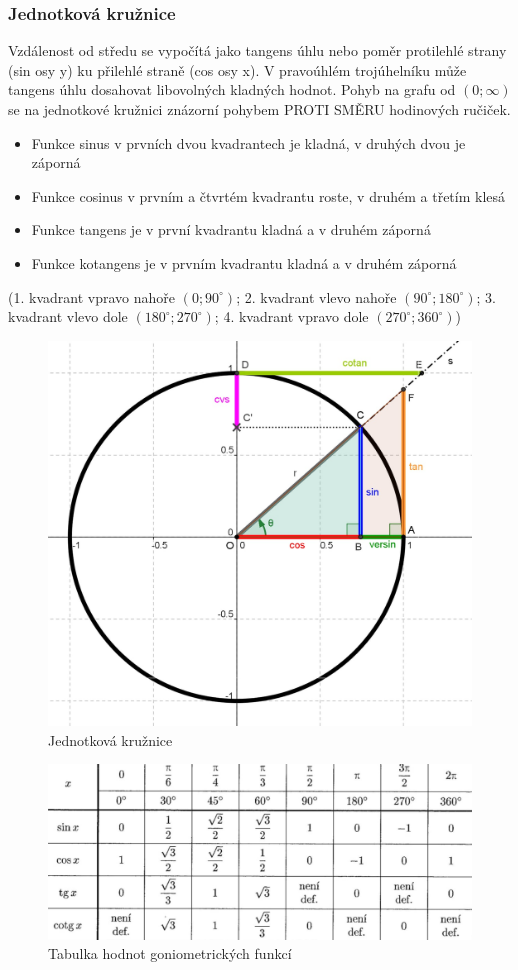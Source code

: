 \subsubsection{Jednotková kružnice}
Vzdálenost od středu se vypočítá jako tangens úhlu nebo poměr protilehlé strany (sin osy y) ku přilehlé straně (cos osy x). V pravoúhlém trojúhelníku může tangens úhlu dosahovat libovolných kladných hodnot. Pohyb na grafu od $(0;\infty)$ se na jednotkové kružnici znázorní pohybem PROTI SMĚRU hodinových ručiček.
\begin{itemize}
    \item Funkce sinus v prvních dvou kvadrantech je kladná, v druhých dvou je záporná
    \item Funkce cosinus v prvním a čtvrtém kvadrantu roste, v druhém a třetím klesá 
    \item Funkce tangens je v první kvadrantu kladná a v druhém záporná
    \item Funkce kotangens je v prvním kvadrantu kladná a v druhém záporná
\end{itemize}
(1. kvadrant vpravo nahoře $(0;90^\circ)$; 2. kvadrant vlevo nahoře $(90^\circ;180^\circ)$; 3. kvadrant vlevo dole $(180^\circ;270^\circ)$; 4. kvadrant vpravo dole $(270^\circ;360^\circ)$)

\begin{figure}
    \centering
    \includegraphics[width=0.5\linewidth]{img/jednotkova_Kruznice.jpg}
    \caption{Jednotková kružnice}
    \label{fig:enter-label}
\end{figure}


\begin{figure}
    \centering
    \includegraphics[width=1\linewidth]{img/tabulka_hodnot_goniometrickych.jpg}
    \caption{Tabulka hodnot goniometrických funkcí}
    \label{fig:enter-label}
\end{figure}

